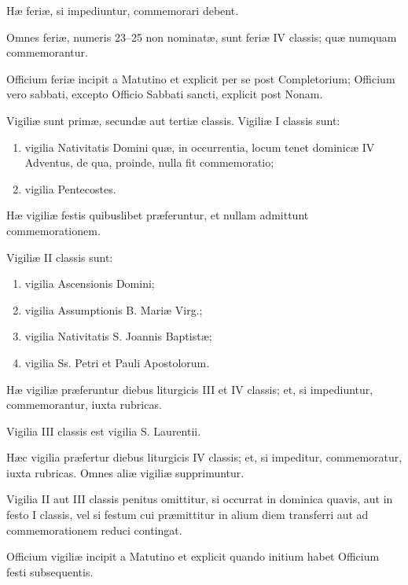 \documentclass[vesperale_romanum.tex]{subfiles}
\begin{document}
Hæ feriæ, si impediuntur, commemorari debent.

Omnes feriæ, numeris 23–25 non nominatæ, sunt feriæ IV classis; quæ numquam commemorantur. %

Officium feriæ incipit a Matutino et explicit per se post Completorium; Officium vero sabbati, excepto Officio Sabbati sancti, explicit post Nonam.


Vigiliæ sunt primæ, secundæ aut tertiæ classis. Vigiliæ I classis sunt:

\begin{enumerate}[nosep,label=\alph*.]
\item  vigilia Nativitatis Domini quæ, in occurrentia, locum tenet dominicæ IV Adventus, de qua, proinde, nulla fit commemoratio;
\item vigilia Pentecostes.
\end{enumerate}

Hæ vigiliæ festis quibuslibet præferuntur, et nullam admittunt commemorationem.

Vigiliæ II classis sunt:

\begin{enumerate}[nosep,label=\alph*.]
\item vigilia Ascensionis Domini;

\item vigilia Assumptionis B. Mariæ Virg.;

\item vigilia Nativitatis S. Joannis Baptistæ;

\item vigilia Ss. Petri et Pauli Apostolorum.
\end{enumerate}

Hæ vigiliæ præferuntur diebus liturgicis III et IV classis; et, si impediuntur, commemorantur, iuxta rubricas.

Vigilia III classis est vigilia S. Laurentii.

Hæc vigilia præfertur diebus liturgicis IV classis; et, si impeditur, commemoratur, iuxta rubricas. Omnes aliæ vigiliæ supprimuntur.

Vigilia II aut III classis penitus omittitur, si occurrat in dominica quavis, aut in festo I classis, vel si festum cui præmittitur in alium diem transferri aut ad commemorationem reduci contingat.

Officium vigiliæ incipit a Matutino et explicit quando initium habet Officium festi subsequentis.
\end{document}
